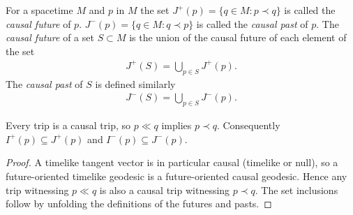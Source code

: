 \begin{definition}
    \label{def:causal-future-and-causal-past}
    \leanok
    For a spacetime $M$ and $p$ in $M$ the set $J^+(p) = \{q \in M : p \prec q\}$ is called the \textit{causal future} of $p$. $J^-(p) = \{q \in M : q \prec p\}$ is called the \textit{causal past} of $p$. The \textit{causal future} of a set $S \subset M$ is the union of the causal future of each element of the set
    \begin{align}
        J^+(S) = \bigcup\limits_{p \in S} J^+(p).
    \end{align}
    The \textit{causal past} of $S$ is defined similarly
    \begin{align}
        J^-(S) = \bigcup\limits_{p \in S} J^-(p).
    \end{align}
\end{definition}

\begin{lemma}
    \label{lmm:chronological-implies-causal}
    \leanok
    Every trip is a causal trip, so $p \ll q$ implies $p \prec q$. Consequently $I^+(p) \subseteq J^+(p)$ and $I^-(p) \subseteq J^-(p)$.
\end{lemma}
\begin{proof}
    \leanok
    A timelike tangent vector is in particular causal (timelike or null), so a future-oriented timelike geodesic is a future-oriented causal geodesic. Hence any trip witnessing $p \ll q$ is also a causal trip witnessing $p \prec q$. The set inclusions follow by unfolding the definitions of the futures and pasts.
\end{proof}

